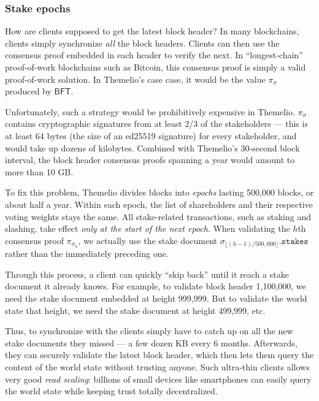 \documentclass[letterpaper,12pt,oneside]{article}
\begin{document}
\subsubsection{Stake epochs} \label{ss:stakeepochs}

How are clients supposed to get the latest block header? In many blockchains, clients simply synchronize \emph{all} the block headers. Clients can then use the consensus proof embedded in each header to verify the next. In ``longest-chain'' proof-of-work blockchains such as Bitcoin, this consensus proof is simply a valid proof-of-work solution. In Themelio's case case, it would be the value $\pi_\sigma$ produced by $\mathsf{BFT}$.

Unfortunately, such a strategy would be prohibitively expensive in Themelio. $\pi_\sigma$ contains cryptographic signatures from at least 2/3 of the stakeholders --- this is at least 64 bytes (the size of an ed25519 signature) for every stakeholder, and would take up dozens of kilobytes. Combined with Themelio's 30-second block interval, the block header consensus proofs spanning a year would amount to more than 10 GB.

To fix this problem, Themelio divides blocks into \textit{epochs} lasting 500,000 blocks, or about half a year. Within each epoch, the list of shareholders and their respective voting weights stays the same. All stake-related transactions, such as staking and slashing, take effect \emph{only at the start of the next epoch}. When validating the $h$th consensus proof $\pi_{\sigma_h}$, we actually use the stake document $\sigma_{\lfloor (h-1)/500,000 \rfloor}.\mathtt{stakes}$ rather than the immediately preceding one.

Through this process, a client can quickly ``skip back'' until it reach a stake document it already knows. For example, to validate block header 1,100,000, we need the stake document embedded at height 999,999. But to validate the world state that height, we need the stake document at height 499,999, etc.

Thus, to synchronize with the clients simply have to catch up on all the new stake documents they missed --- a few dozen KB every 6 months. Afterwards, they can securely validate the latest block header, which then lets them query the content of the world state without trusting anyone. Such ultra-thin clients allows very good \emph{read scaling}: billions of small devices like smartphones can easily query the world state while keeping trust totally decentralized.
\end{document}
